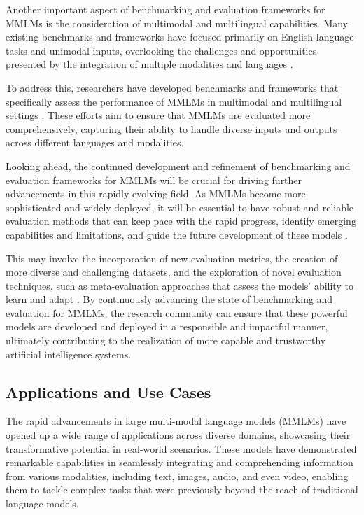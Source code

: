 \documentclass[11pt]{article}
\begin{document}
Another important aspect of benchmarking and evaluation frameworks for MMLMs is the consideration of multimodal and multilingual capabilities. Many existing benchmarks and frameworks have focused primarily on English-language tasks and unimodal inputs, overlooking the challenges and opportunities presented by the integration of multiple modalities and languages \cite{ref62,ref63}.

To address this, researchers have developed benchmarks and frameworks that specifically assess the performance of MMLMs in multimodal and multilingual settings \cite{ref48,ref64}. These efforts aim to ensure that MMLMs are evaluated more comprehensively, capturing their ability to handle diverse inputs and outputs across different languages and modalities.

Looking ahead, the continued development and refinement of benchmarking and evaluation frameworks for MMLMs will be crucial for driving further advancements in this rapidly evolving field. As MMLMs become more sophisticated and widely deployed, it will be essential to have robust and reliable evaluation methods that can keep pace with the rapid progress, identify emerging capabilities and limitations, and guide the future development of these models \cite{ref65,ref66}.

This may involve the incorporation of new evaluation metrics, the creation of more diverse and challenging datasets, and the exploration of novel evaluation techniques, such as meta-evaluation approaches that assess the models' ability to learn and adapt \cite{ref67,ref68}. By continuously advancing the state of benchmarking and evaluation for MMLMs, the research community can ensure that these powerful models are developed and deployed in a responsible and impactful manner, ultimately contributing to the realization of more capable and trustworthy artificial intelligence systems.

\subsection{Applications and Use Cases}

The rapid advancements in large multi-modal language models (MMLMs) have opened up a wide range of applications across diverse domains, showcasing their transformative potential in real-world scenarios. These models have demonstrated remarkable capabilities in seamlessly integrating and comprehending information from various modalities, including text, images, audio, and even video, enabling them to tackle complex tasks that were previously beyond the reach of traditional language models.
\end{document}
